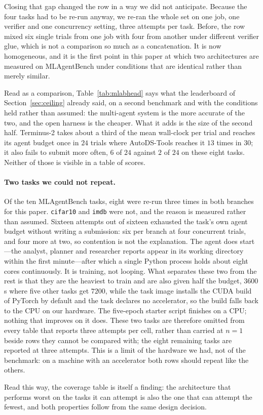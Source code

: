 Closing that gap changed the row in a way we did not anticipate. Because the four
tasks had to be re-run anyway, we re-ran the whole set on one job, one verifier
and one concurrency setting, three attempts per task. Before, the row mixed six single trials
from one job with four from another under different verifier glue, which is not
a comparison so much as a concatenation. It is now homogeneous, and it is the first
point in this paper at which two architectures are measured on MLAgentBench under
conditions that are identical rather than merely similar.



Read as a comparison, Table~\ref{tab:mlabhead} says what the leaderboard of
Section~\ref{sec:ceiling} already said, on a second benchmark and with the
conditions held rather than assumed: the multi-agent system is the more accurate
of the two, and the open harness is the cheaper. What it adds is the size of the
second half. Terminus-2 takes about a third of the mean wall-clock per trial and
reaches its agent budget once in $24$ trials where AutoDS-Tools reaches it $13$
times in $30$; it also fails to submit more often, $6$ of $24$ against $2$ of
$24$ on these eight tasks. Neither of those is visible in a table of scores.


\paragraph{Two tasks we could not repeat.} Of the ten MLAgentBench tasks, eight
were re-run three times in both branches for this paper. \texttt{cifar10} and
\texttt{imdb} were not, and the reason is measured rather than assumed. Sixteen
attempts out of sixteen exhausted the task's own agent budget without writing a
submission: six per branch at four concurrent trials, and four more at two, so
contention is not the explanation. The agent does start---the analyst, planner
and researcher reports appear in its working directory within the first
minute---after which a single Python process holds about eight cores
continuously. It is training, not looping. What separates these two from the
rest is that they are the heaviest to train and are also given half the budget,
$3600$\,s where five other tasks get $7200$, while the task image installs the
CUDA build of PyTorch by default and the task declares no accelerator, so the
build falls back to the CPU on our hardware. The five-epoch starter script
finishes on a CPU; nothing that improves on it does. These two tasks are
therefore omitted from every table that reports three attempts per cell, rather
than carried at $n=1$ beside rows they cannot be compared with; the eight
remaining tasks are reported at three attempts. This is a limit of the hardware
we had, not of the benchmark: on a machine with an accelerator both rows should
repeat like the others.

Read this way, the coverage table is itself a finding: the architecture that
performs worst on the tasks it can attempt is also the one that can attempt the
fewest, and both properties follow from the same design decision.
